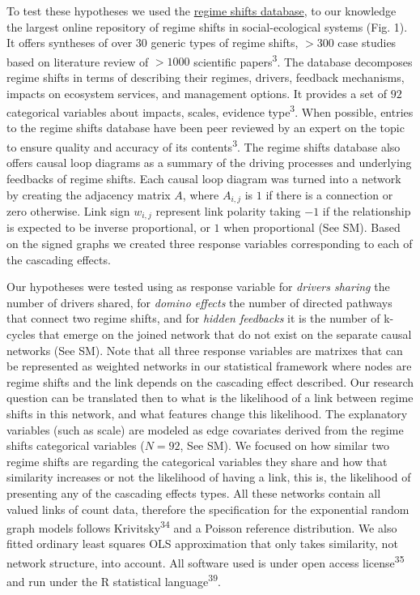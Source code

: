 \documentclass[9pt,]{article}
\begin{document}
To test these hypotheses we used the \href{www.regimeshifts.org}{regime
shifts database}, to our knowledge the largest online repository of
regime shifts in social-ecological systems (Fig. 1). It offers syntheses
of over \(30\) generic types of regime shifts, \(> 300\) case studies
based on literature review of \(> 1000\) scientific
papers\textsuperscript{3}. The database decomposes regime shifts in
terms of describing their regimes, drivers, feedback mechanisms, impacts
on ecosystem services, and management options. It provides a set of
\(92\) categorical variables about impacts, scales, evidence
type\textsuperscript{3}. When possible, entries to the regime shifts
database have been peer reviewed by an expert on the topic to ensure
quality and accuracy of its contents\textsuperscript{3}. The regime
shifts database also offers causal loop diagrams as a summary of the
driving processes and underlying feedbacks of regime shifts. Each causal
loop diagram was turned into a network by creating the adjacency matrix
\(A\), where \(A_{i,j}\) is \(1\) if there is a connection or zero
otherwise. Link sign \(w_{i,j}\) represent link polarity taking \(-1\)
if the relationship is expected to be inverse proportional, or \(1\)
when proportional (See SM). Based on the signed graphs we created three
response variables corresponding to each of the cascading effects.

Our hypotheses were tested using as response variable for \emph{drivers
sharing} the number of drivers shared, for \emph{domino effects} the
number of directed pathways that connect two regime shifts, and for
\emph{hidden feedbacks} it is the number of k-cycles that emerge on the
joined network that do not exist on the separate causal networks (See
SM). Note that all three response variables are matrixes that can be
represented as weighted networks in our statistical framework where
nodes are regime shifts and the link depends on the cascading effect
described. Our research question can be translated then to what is the
likelihood of a link between regime shifts in this network, and what
features change this likelihood. The explanatory variables (such as
scale) are modeled as edge covariates derived from the regime shifts
categorical variables (\(N=92\), See SM). We focused on how similar two
regime shifts are regarding the categorical variables they share and how
that similarity increases or not the likelihood of having a link, this
is, the likelihood of presenting any of the cascading effects types. All
these networks contain all valued links of count data, therefore the
specification for the exponential random graph models follows
Krivitsky\textsuperscript{34} and a Poisson reference distribution. We
also fitted ordinary least squares OLS approximation that only takes
similarity, not network structure, into account. All software used is
under open access license\textsuperscript{35} and run under the R
statistical language\textsuperscript{39}.
\end{document}
